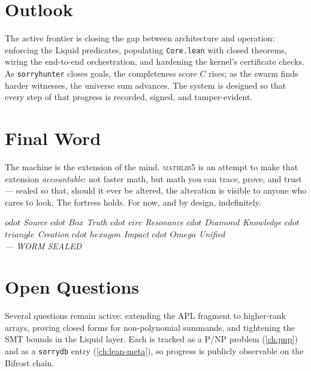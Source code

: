 \section{Outlook}
\label{sec:con-outlook}

The active frontier is closing the gap between architecture and operation:
enforcing the Liquid predicates, populating \texttt{Core.lean} with closed
theorems, wiring the end-to-end orchestration, and hardening the kernel's
certificate checks. As \texttt{sorryhunter} closes goals, the completeness
score $C$ rises; as the swarm finds harder witnesses, the universe sum
advances. The system is designed so that every step of that progress is
recorded, signed, and tamper-evident.

\section{Final Word}
\label{sec:con-final}

The machine is the extension of the mind. \textsc{mathlib5} is an attempt to
make that extension \emph{accountable}: not faster math, but math you can
trace, prove, and trust --- sealed so that, should it ever be altered, the
alteration is visible to anyone who cares to look. The fortress holds. For
now, and by design, indefinitely.

\vspace{0.3in}
\begin{center}
\itshape
\ensuremath{odot} Source \ensuremath{cdot} \ensuremath{Box} Truth \ensuremath{cdot} \ensuremath{circ} Resonance \ensuremath{cdot} \ensuremath{Diamond} Knowledge \ensuremath{cdot} \ensuremath{triangle} Creation \ensuremath{cdot} \ensuremath{hexagon} Impact \ensuremath{cdot} \ensuremath{Omega} Unified \\
--- WORM SEALED
\end{center}

\section{Open Questions}
\label{sec:concl-open}

Several questions remain active: extending the APL fragment to
higher-rank arrays, proving closed forms for non-polynomial summands, and
tightening the SMT bounds in the Liquid layer. Each is tracked as a P/NP
problem (\cref{ch:pnp}) and as a \texttt{sorrydb} entry (\cref{ch:lean-meta}),
so progress is publicly observable on the Bifrost chain.
